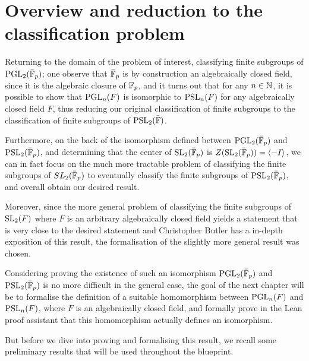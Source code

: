 



\section{Overview and reduction to the classification problem}

Returning to the domain of the problem of interest, classifying finite subgroups of $\operatorname{PGL}_2(\bar{\mathbb{F}}_p)$; one observe that $\bar{\mathbb{F}}_p$ is by construction an algebraically closed field, since it is the algebraic closure of $\mathbb{F}_p$,
and it turns out that for any $n \in \mathbb{N}$, it is possible to show that $\operatorname{PGL}_n(F)$ is isomorphic to $\operatorname{PSL}_n(F)$ for any algebraically closed field $F$, thus reducing our original classification of finite subgroups to the classification of finite subgroups of $\operatorname{PSL}_2(\bar{\mathbb{F}})$.

Furthermore, on the back of the isomorphism defined between $\operatorname{PGL}_2(\bar{\mathbb{F}}_p)$ and $\operatorname{PSL}_2(\bar{\mathbb{F}}_p)$, and determining that the center of $\operatorname{SL}_2(\bar{\mathbb{F}}_p)$ is $Z(\operatorname{SL}_2(\bar{\mathbb{F}}_p)) = \langle -I\rangle$, we can in fact focus on the much more tractable problem of 
classifying the finite subgroups of $SL_2(\bar{\mathbb{F}}_p)$ to eventually classify the finite subgroups of $\operatorname{PSL}_2(\bar{\mathbb{F}}_p)$, and overall obtain our desired result. 

Moreover, since the more general problem of classifying the finite subgroups of $\operatorname{SL}_2(F)$ where $F$ is an arbitrary algebraically closed field
yields a statement that is very close to the desired statement and Christopher Butler has a in-depth exposition of this result, the formalisation of the slightly more general result was chosen.

Considering proving the existence of such an isomorphism $\operatorname{PGL}_2(\bar{\mathbb{F}}_p)$ and $\operatorname{PSL}_2(\bar{\mathbb{F}}_p)$ is no more difficult in the general case, 
the goal of the next chapter will be to formalise the definition of a suitable homomorphism between $\operatorname{PGL}_n(F)$ and $\operatorname{PSL}_n(F)$, where $F$ is an algebraically closed field, 
and formally prove in the Lean proof assistant that this homomorphism actually defines an isomorphism.

But before we dive into proving and formalising this result, we recall some preliminary results that will be used throughout the blueprint.
